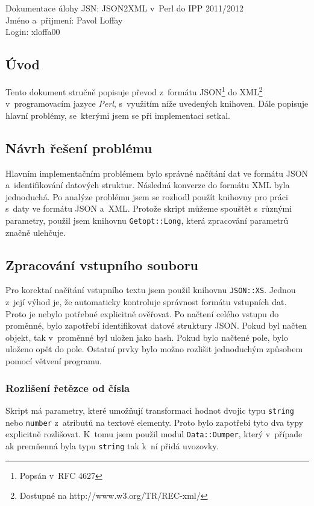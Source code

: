 \documentclass[10pt,a4paper]{article}
\begin{document}
\noindent Dokumentace úlohy JSN: JSON2XML v~Perl do IPP 2011/2012 \\
Jméno a~přijmení: Pavol Loffay \\
Login: xloffa00

\setcounter{section}{1}
\subsection{Úvod}
Tento dokument stručně popisuje převod z~formátu JSON\footnote{Popsán
v~RFC 4627} do XML\footnote{Dostupné na http://www.w3.org/TR/REC-xml/}
v~programovacím jazyce \emph{Perl}, s~využitím níže uvedených knihoven. Dále 
popisuje hlavní problémy, se~kterými jsem se při implementaci setkal.

\subsection{Návrh řešení problému} 
Hlavním implementačním problémem bylo správné načítání dat ve formátu
JSON a~identifikování datových struktur. Následná konverze do formátu
XML byla jednoduchá. Po analýze problému jsem se rozhodl použít knihovny pro práci 
s~daty ve formátu JSON a~XML. Protože skript můžeme spouštět s~různými parametry,
použil jsem knihovnu \texttt{Getopt::Long}, která zpracování
parametrů značně ulehčuje.

\subsection{Zpracování vstupního souboru}
Pro korektní načítání vstupního textu jsem použil knihovnu \texttt{JSON::XS}.
Jednou z~její výhod je, že automaticky kontroluje správnost formátu
vstupních dat. Proto je nebylo potřebné explicitně ověřovat. 
Po načtení celého vstupu do proměnné, bylo zapotřebí identifikovat datové struktury
JSON. Pokud byl načten objekt, tak v~proměnné byl uložen jako 
hash. Pokud bylo načtené pole, bylo uloženo opět do pole. Ostatní prvky bylo možno 
rozlišit jednoduchým způsobem pomocí větvení programu.

\subsubsection{Rozlišení řetězce od čísla}
Skript má parametry, které umožňují transformaci hodnot dvojic typu
\texttt{string} nebo \texttt{number} z~atributů na textové elementy. Proto 
bylo zapotřebí tyto dva typy explicitně rozlišovat. K~tomu jsem použil
modul \texttt{Data::Dumper}, který v~případe ak premňenná byla typu \texttt{string}
tak k~ní přidá uvozovky.
\end{document}

